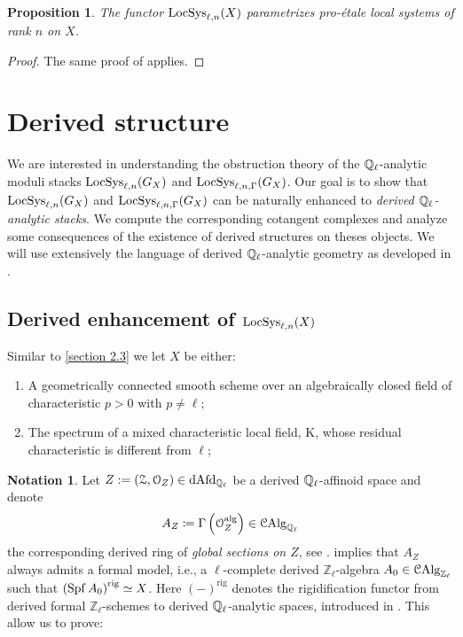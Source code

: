\documentclass[10pt,a4paper]{amsart}
\numberwithin{equation}{subsection}
\theoremstyle{plain}
\newtheorem{prop}[theorem]{Proposition}
\theoremstyle{definition}
\newtheorem{notation}[theorem]{Notation}
\theoremstyle{remark}
\numberwithin{equation}{section}
\begin{document}
\begin{prop}{\cite[Corollary 3.2.5]{me1}}
The functor $\mathrm{LocSys}_{\ell, n}(X)$ parametrizes pro-\'etale local systems of rank $n$ on $X$.
\end{prop}

\begin{proof}
The same proof of \cite[Corollary 3.2.5]{me1} applies.
\end{proof}

\section{Derived structure}
We are interested in understanding the obstruction theory of the $\mathbb{Q}_\ell$-analytic moduli stacks $\mathrm{LocSys}_{\ell, n}(G_X)$ and $\mathrm{LocSys}_{\ell, n, \Gamma}(G_X)$. Our goal is to show that $\mathrm{LocSys}_{\ell, n}(G_X)$ and
$\mathrm{LocSys}_{\ell, n, \Gamma}(G_X)$ can be naturally enhanced to \emph{derived $ \mathbb{Q}_{\ell}$-analytic stacks}. We compute the corresponding cotangent complexes and analyze some consequences of the existence of derived structures on theses objects.
We will use extensively the language of derived $\mathbb{Q}_{\ell}$-analytic geometry as developed in \cite{porta_der, porta_rep}.


\subsection{Derived enhancement of $\mathrm{LocSys}_{\ell, n}(X)$} Similar to \cref{section 2.3} we let $X$ be either:
\begin{enumerate}
\item A geometrically connected smooth scheme over an algebraically closed field of characteristic $p>0$ with $p \neq \ell$;
\item The spectrum of a mixed characteristic local field, K, whose residual characteristic is different from $\ell$;
\end{enumerate}



\begin{notation}
Let $Z : = (\mathcal Z, \mathcal{O}_Z) \in \mathrm{dAfd}_{\mathbb{Q}_\ell}$ be a
derived $\mathbb{Q}_{\ell}$-affinoid space and denote 
	\[
	A_Z \coloneqq \Gamma \left(  \mathcal{O}_Z^{\mathrm{alg}} \right) \in \mathcal{C}\mathrm{Alg}_{\mathbb{Q}_{\ell}}
	\]
the corresponding derived ring of \emph{global sections on $Z$}, see \cite[Theorem 3.1]{porta_hom}.
\cite[Theorem 3.3.8]{me2} implies that $A_Z$ always admits a formal model, i.e., a $\ell$-complete derived
$\mathbb Z_{\ell}$-algebra $A_0 \in \mathcal{C}\mathrm{Alg}_{\mathbb Z_\ell}$ such that $\left( \operatorname{Spf} A_0 \right)^{\mathrm{rig}} \simeq X$. Here $(-)^{\mathrm{rig}}$ denotes the rigidification functor from derived formal $\mathbb Z_\ell$-schemes to derived
$\mathbb{Q}_\ell$-analytic spaces, introduced in \cite[section 3]{me2}. This allow us to prove:
\end{notation}
\end{document}

